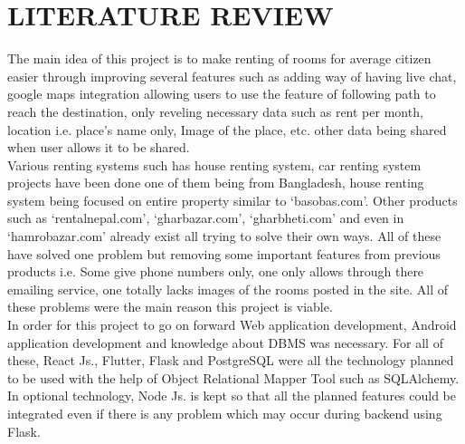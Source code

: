 \chapter{LITERATURE REVIEW}
The main idea of this project is to make renting of rooms for average citizen easier through improving several features such as adding way of having live chat, google maps integration allowing users to use the feature of following path to reach the destination, only reveling necessary data such as rent per month, location i.e. place’s name only, Image of the place, etc. other data being shared when user allows it to be shared. \\
Various renting systems such has house renting system\cite{houserent}, car renting system projects have been done one of them being from Bangladesh, house renting system being focused on entire property similar to ‘basobas.com’. Other products such as ‘rentalnepal.com’, ‘gharbazar.com’, ‘gharbheti.com’ and even in ‘hamrobazar.com’ already exist all trying to solve their own ways. All of these have solved one problem but removing some important features from previous products i.e. Some give phone numbers only, one only allows through there emailing service, one totally lacks images of the rooms posted in the site. All of these problems were the main reason this project is viable. \\
In order for this project to go on forward Web application development, Android application development and knowledge about DBMS was necessary. For all of these, React Js., Flutter, Flask and PostgreSQL were all the technology planned to be used with the help of Object Relational Mapper Tool such as SQLAlchemy. In optional technology, Node Js. is kept so that all the planned features could be integrated even if there is any problem which may occur during backend using Flask.
